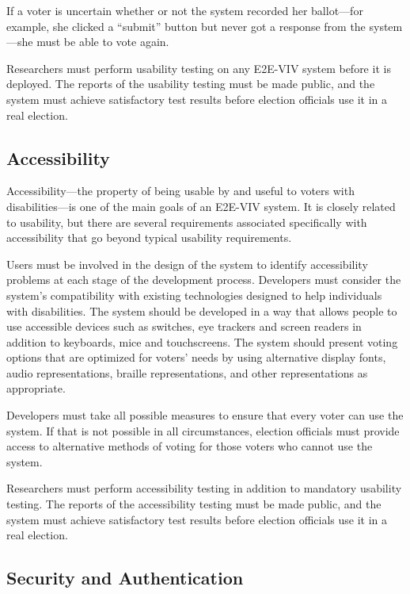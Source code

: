 If a voter is uncertain whether or not the system recorded her
ballot---for example, she clicked a ``submit'' button but never got a
response from the system---she must be able to vote again.

Researchers must perform usability testing on any E2E-VIV system
before it is deployed. The reports of the usability testing must be
made public, and the system must achieve satisfactory test results
before election officials use it in a real election.

\subsection{Accessibility}

Accessibility---the property of being usable by and useful to voters
with disabilities---is one of the main goals of an E2E-VIV system. It
is closely related to usability, but there are several requirements
associated specifically with accessibility that go beyond typical
usability requirements.

Users must be involved in the design of the system to identify
accessibility problems at each stage of the development
process. Developers must consider the system's compatibility with
existing technologies designed to help individuals with disabilities.
The system should be developed in a way that allows people to use
accessible devices such as switches, eye trackers and screen readers
in addition to keyboards, mice and touchscreens. The system should
present voting options that are optimized for voters' needs by using
alternative display fonts, audio representations, braille
representations, and other representations as appropriate.

Developers must take all possible measures to ensure that every voter
can use the system. If that is not possible in all circumstances,
election officials must provide access to alternative methods of
voting for those voters who cannot use the system.

Researchers must perform accessibility testing in addition to
mandatory usability testing. The reports of the accessibility testing
must be made public, and the system must achieve satisfactory test
results before election officials use it in a real election.

\subsection{Security and Authentication}

